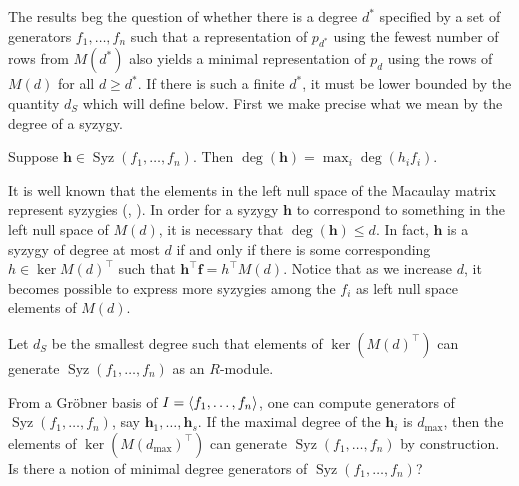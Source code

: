 \documentclass[10pt,letterpaper,oneside]{amsart}
\DeclareMathOperator{\Syz}{Syz}
\renewcommand{\bf}{\mathbf}
\begin{document}
\newpage


The results beg the question of whether there is a degree $d^*$ specified by a set of generators $f_1, \dots, f_n$ such that a representation of $p_{d^*}$ using the fewest number of rows from $M(d^*)$ also yields a minimal representation of $p_d$ using the rows of $M(d)$ for all $d \ge d^*$. If there is such a finite $d^*$, it must be lower bounded by the quantity $d_S$ which will define below. First we make precise what we mean by the degree of a syzygy.

\begin{definition}
Suppose $\bf{h} \in \Syz(f_1, \dots, f_n)$. Then $\deg(\bf{h}) = \max_i \deg(h_i f_i)$. 
\end{definition}

It is well known that the elements in the left null space of the Macaulay matrix represent syzygies (\cite{batselier2014null}, \cite{stetter2004numerical}). In order for a syzygy $\bf{h}$ to correspond to something in the left null space of $M(d)$, it is necessary that $\deg(\bf{h}) \le d$. In fact, $\bf{h}$ is a syzygy of degree at most $d$ if and only if there is some corresponding $h \in \ker M(d)^\top$ such that $\bf{h}^\top \bf{f} = h^\top M(d)$. Notice that as we increase $d$, it becomes possible to express more syzygies among the $f_i$ as left null space elements of $M(d)$. 
\begin{definition}
Let $d_S$ be the smallest degree such that elements of $\ker(M(d)^\top)$ can generate $\Syz(f_1, \dots, f_n)$ as an $R$-module. 
\end{definition}

From a Gr\"{o}bner basis of $I = \langle f_1, \dots, f_n\rangle$, one can compute generators of $\Syz(f_1, \dots, f_n)$, say $\bf{h}_1,\dots, \bf{h}_s$. If the maximal degree of the $\bf{h}_i$ is $d_{\max}$, then the elements of $\ker(M(d_{\max})^\top)$ can generate $\Syz(f_1, \dots, f_n)$ by construction. Is there a notion of minimal degree generators of $\Syz(f_1, \dots, f_n)$?
\end{document}
